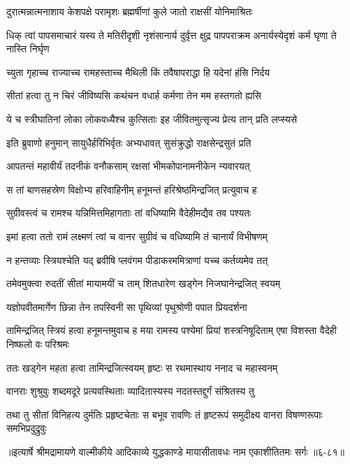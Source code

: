 \twolineshloka
{दुरात्मन्नात्मनाशाय केशपक्षे परामृशः}
{ब्रह्मर्षीणां कुले जातो राक्षसीं योनिमाश्रितः} %

\threelineshloka
{धिक् त्वां पापसमाचारं यस्य ते मतिरीदृशी}
{नृशंसानार्य दुर्वृत्त क्षुद्र पापपराक्रम}
{अनार्यस्येदृशं कर्म घृणा ते नास्ति निर्घृण} %

\twolineshloka
{च्युता गृहाच्च राज्याच्च रामहस्ताच्च मैथिली}
{किं तवैषापराद्धा हि यदेनां हंसि निर्दय} %

\twolineshloka
{सीतां हत्वा तु न चिरं जीविष्यसि कथंचन}
{वधार्ह कर्मणा तेन मम हस्तगतो ह्यसि} %

\twolineshloka
{ये च स्त्रीघातिनां लोका लोकवध्यैश्च कुत्सिताः}
{इह जीवितमुत्सृज्य प्रेत्य तान् प्रति लप्स्यसे} %

\twolineshloka
{इति ब्रुवाणो हनुमान् सायुधैर्हरिभिर्वृतः}
{अभ्यधावत् सुसंक्रुद्धो राक्षसेन्द्रसुतं प्रति} %

\twolineshloka
{आपतन्तं महावीर्यं तदनीकं वनौकसाम्}
{रक्षसां भीमकोपानामनीकेन न्यवारयत्} %

\twolineshloka
{स तां बाणसहस्रेण विक्षोभ्य हरिवाहिनीम्}
{हनूमन्तं हरिश्रेष्ठमिन्द्रजित् प्रत्युवाच ह} %

\twolineshloka
{सुग्रीवस्त्वं च रामश्च यन्निमित्तमिहागताः}
{तां वधिष्यामि वैदेहीमद्यैव तव पश्यतः} %

\twolineshloka
{इमां हत्वा ततो रामं लक्ष्मणं त्वां च वानर}
{सुग्रीवं च वधिष्यामि तं चानार्यं विभीषणम्} %

\twolineshloka
{न हन्तव्याः स्त्रियश्चेति यद् ब्रवीषि प्लवंगम}
{पीडाकरममित्राणां यच्च कर्तव्यमेव तत्} %

\twolineshloka
{तमेवमुक्त्वा रुदतीं सीतां मायामयीं च ताम्}
{शितधारेण खड्गेन निजघानेन्द्रजित् स्वयम्} %

\twolineshloka
{यज्ञोपवीतमार्गेण छिन्ना तेन तपस्विनी}
{सा पृथिव्यां पृथुश्रोणी पपात प्रियदर्शना} %

\threelineshloka
{तामिन्द्रजित् स्त्रियं हत्वा हनूमन्तमुवाच ह}
{मया रामस्य पश्येमां प्रियां शस्त्रनिषूदिताम्}
{एषा विशस्ता वैदेही निष्फलो वः परिश्रमः} %

\twolineshloka
{ततः खड्गेन महता हत्वा तामिन्द्रजित्स्वयम्}
{हृष्टः स रथमास्थाय ननाद च महास्वनम्} %

\twolineshloka
{वानराः शुश्रुवुः शब्दमदूरे प्रत्यवस्थिताः}
{व्यादितास्यस्य नदतस्तद्दुर्गं संश्रितस्य तु} %

\twolineshloka
{तथा तु सीतां विनिहत्य दुर्मतिः प्रहृष्टचेताः स बभूव रावणिः}
{तं हृष्टरूपं समुदीक्ष्य वानरा विषण्णरूपाः समभिप्रदुद्रुवुः} %


॥इत्यार्षे श्रीमद्रामायणे वाल्मीकीये आदिकाव्ये युद्धकाण्डे मायासीतावधः नाम एकाशीतितमः सर्गः ॥६-८१॥
